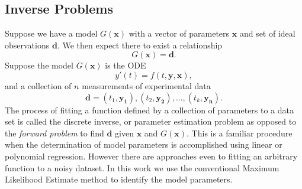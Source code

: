\documentclass[12pt,a4paper,oneside]{book}
\begin{document}
\subsection{Inverse Problems}
Suppose we have a model $G(\mathbf{x})$ with a vector of parameters $\mathbf{x}$ and set of ideal observations $\mathbf{d}$. We then expect there to exist a relationship 
\[G(\mathbf{x}) = \mathbf{d} .\]
Suppose the model $G(\mathbf{x})$ is the ODE
\[ y'(t) = f(t, \mathbf{y}, \mathbf{x}),\]
and a collection of $n$ measurements of experimental data
\[ \mathbf{d} = \left( t_1, \mathbf{y_1} \right), 
\left( t_2, \mathbf{y_2} \right), ... ,
\left( t_k, \mathbf{y_n} \right).\]
The process of fitting a function defined by a collection of parameters to a data set is called the discrete inverse, or parameter estimation problem as opposed to the \emph{forward problem} to find $\mathbf{d}$ given $\mathbf{x}$ and $G(\mathbf{x})$. This is a familiar procedure when the determination of model parameters is accomplished using linear or polynomial regression. However there are approaches even to fitting an arbitrary function to a noisy dataset. In this work we use the conventional Maximum Likelihood Estimate method to identify the model parameters.
\end{document}
